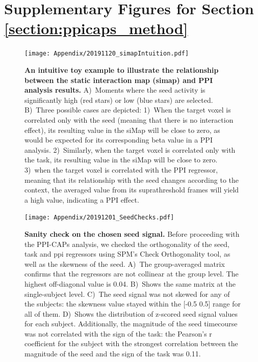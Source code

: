 \clearpage
\section{Supplementary Figures for Section \ref{section:ppicaps_method}} \label{Supp}




\begin{figure}[h]
\centering
\texttt{[image: Appendix/20191120\_simapIntuition.pdf]}
\caption{\textbf{An intuitive toy example to illustrate the relationship between the static interaction map (simap) and PPI analysis results.} A)~Moments where the seed activity is significantly high (red stars) or low (blue stars) are selected. B)~Three possible cases are depicted: 1)~When the target voxel is correlated only with the seed (meaning that there is no interaction effect), its resulting value in the siMap will be close to zero, as would be expected for its corresponding beta value in a PPI analysis. 2)~Similarly, when the target voxel is correlated only with the task, its resulting value in the siMap will be close to zero. 3)~when the target voxel is correlated with the PPI regressor, meaning that its relationship with the seed changes according to the context, the averaged value from its suprathreshold frames will yield a high value, indicating a PPI effect.}
\label{fig:simapIntuition}
\end{figure}


\begin{figure}[h]
\centering
\texttt{[image: Appendix/20191201\_SeedChecks.pdf]}
\caption{\textbf{Sanity check on the chosen seed signal.} Before proceeding with the PPI-CAPs analysis, we checked the orthogonality of the seed, task and ppi regressors using SPM's Check Orthogonality tool, as well as the skewness of the seed. A)~The group-averaged matrix confirms that the regressors are not collinear at the group level. The highest off-diagonal value is 0.04. B)~Shows the same matrix at the single-subject level. C)~The seed signal was not skewed for any of the subjects: the skewness value stayed within the [-0.5 0.5] range for all of them. D)~Shows the distribution of z-scored seed signal values for each subject. Additionally, the magnitude of the seed timecourse was not correlated with the sign of the task: the Pearson’s r coefficient for the subject with the strongest correlation between the magnitude of the seed and the sign of the task was 0.11.  }\label{fig:seedcheck}
\end{figure}

